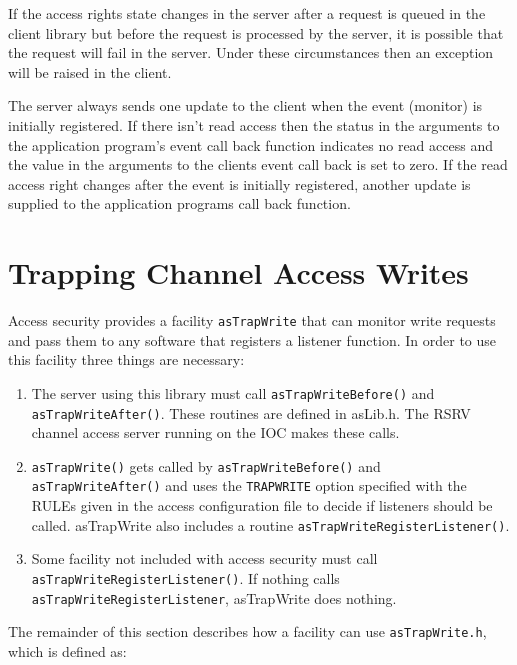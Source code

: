 If the access rights state changes in the server after a request is queued in the client library but before the request is processed by the server, it is possible that the request will fail in the server.
Under these circumstances then an exception will be raised in the client.

The server always sends one update to the client when the event (monitor) is initially registered.
If there isn't read access then the status in the arguments to the application program's event call back function indicates no read access and the value in the arguments to the clients event call back is set to zero.
If the read access right changes after the event is initially registered, another update is supplied to the application programs call back function.

\section{Trapping Channel Access Writes}

Access security provides a facility \verb|asTrapWrite| that can monitor write requests and pass them to any software that registers a listener function.
In order to use this facility three things are necessary:

\begin{enumerate}
\item The server using this library must call \verb|asTrapWriteBefore()| and \verb|asTrapWriteAfter()|.
These routines are defined in asLib.h.
The RSRV channel access server running on the IOC makes these calls.

\item \verb|asTrapWrite()| gets called by \verb|asTrapWriteBefore()| and\verb| asTrapWriteAfter()| and uses the \verb|TRAPWRITE| option specified with the RULEs given in the access configuration file to decide if listeners should be called.
asTrapWrite also includes a routine \verb|asTrapWriteRegisterListener()|.

\item Some facility not included with access security must call \verb|asTrapWriteRegisterListener()|.
If nothing calls \verb|asTrapWriteRegisterListener|, asTrapWrite does nothing.

\end{enumerate}

The remainder of this section describes how a facility can use \verb|asTrapWrite.h|, which is defined as:

